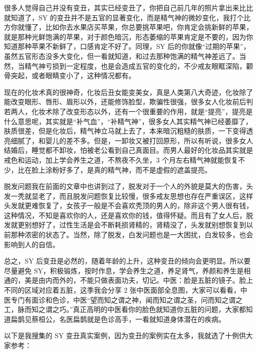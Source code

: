 \documentclass[fontset=founder]{ctexart}
\begin{document}
很多人觉得自己并没有变丑，其实已经变丑了，你把自己前几年的照片拿出来比比就知道了，SY 的变丑并不是五官的显著变化，而是精气神的微妙变化，我打个比方你就懂了，比如你去水果店买苹果，你总要挑苹果吧，你肯定会挑新鲜的苹果，就是那种光鲜饱满的苹果，对于颜色暗沉，形态萎缩的苹果肯定是不要的，因为你知道那种苹果不新鲜了，口感肯定不好了。同理，SY 后的你就像“过期的苹果”，虽然五官形态没多大变化，但一看就知道，和过去那种饱满的精气神差远了。当然，当精气神亏损到一定程度，也是会造成五官的变化的，不少戒友眼眶深陷，颧骨突起，或者眼睛变小了，这种情况都有。

现在的化妆术真的很神奇，化妆后丑女能变美女，真是人类第八大奇迹，化妆除了能改变眼形、唇形、眉形以外，还能修饰脸型，欺骗性很强，很多女人化妆前后判若两人，化妆术除了改变形态以外，还有一个很重要的作用，就是“提亮”，提亮是什么意思呢，其实就是“补气血”，“补精气神”，很多女人其实精气神已经萎靡了，肤质很差，但是化妆后，精气神立马就上去了，本来暗沉粗糙的肤质，一下变得透亮细腻了，和婴儿的差不多。但是，一卸妆又被打回原形，所以有听说，很多女人结婚后，睡觉都不卸妆，怕被老公看到自己真面目。而男人最好的化妆品其实就是戒色和运动，加上学会养生之道，不熬夜不久坐，3 个月左右精气神就能恢复不少，比在脸上涂粉好多了，是真的精气神，而不是虚假的遮盖提亮。

脱发问题我在前面的文章中也讲到过了，脱发对于一个人的外貌是莫大的伤害，头发一秃就显老了，而且脱发问题恢复比较慢，很多戒友思想也存在严重误区，这样头发就更难恢复了，女孩子一般是不会喜欢秃顶的男人的，除非这个男人很有钱，这种情况，不知是喜欢你的人，还是喜欢你的钱，值得怀疑。而且有了女人后，脱发就更别想好了，过性生活是会不断耗损肾精的，肾精没了，头发就别想恢复到以前那种浓密的状态了。当然，除了脱发，白发问题也是一大困扰，白发较多，也会影响到人的自信。

总之，SY 后变丑是必然的，随着年龄的上升，这种变丑的倾向会更明显。所以要尽量避免 SY，积极锻炼，按时作息，学会养生之道，养足肾气，养颜和养生是相通的，美是由内而外的，不能只做表面功夫，切记。中医：脸是五脏的镜子。脸上不同的区域对应着五脏，这季我会分享 2 张中医面部全息图，大家可以看看，中医专门有面诊和色诊，中医“望而知之谓之神，闻而知之谓之圣，问而知之谓之工，脉而知之谓之巧。”真正高明的中医看你的脸色就知道你五脏的问题，大家都知道扁鹊见蔡桓公，名医扁鹊就是色诊高手，一看就知道身体潜在的疾病。

以下是我搜集的 SY 变丑真实案例，因为变丑的案例实在太多，我就选了十例供大家参考：
\end{document}
